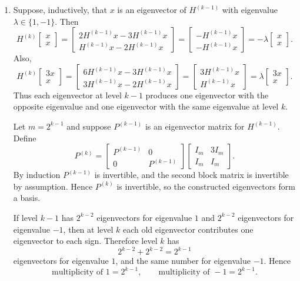 \documentclass[12pt]{article}
\begin{document}
\begin{enumerate}[label=(\alph*)]
  \item Suppose, inductively, that $x$ is an eigenvector of $H^{(k-1)}$ with eigenvalue $\lambda\in\{1,-1\}$. Then
  \[
  H^{(k)}\begin{bmatrix}x\\x\end{bmatrix}
  =\begin{bmatrix}2H^{(k-1)}x-3H^{(k-1)}x\\H^{(k-1)}x-2H^{(k-1)}x\end{bmatrix}
  =\begin{bmatrix}-H^{(k-1)}x\\-H^{(k-1)}x\end{bmatrix}
  =-\lambda\begin{bmatrix}x\\x\end{bmatrix}.
  \]
  Also,
  \[
  H^{(k)}\begin{bmatrix}3x\\x\end{bmatrix}
  =\begin{bmatrix}6H^{(k-1)}x-3H^{(k-1)}x\\3H^{(k-1)}x-2H^{(k-1)}x\end{bmatrix}
  =\begin{bmatrix}3H^{(k-1)}x\\H^{(k-1)}x\end{bmatrix}
  =\lambda\begin{bmatrix}3x\\x\end{bmatrix}.
  \]
  Thus each eigenvector at level $k-1$ produces one eigenvector with the opposite eigenvalue and one eigenvector with the same eigenvalue at level $k$.

  Let $m=2^{k-1}$ and suppose $P^{(k-1)}$ is an eigenvector matrix for $H^{(k-1)}$. Define
  \[
  P^{(k)}=\begin{bmatrix}P^{(k-1)}&0\\0&P^{(k-1)}\end{bmatrix}
  \begin{bmatrix}I_m&3I_m\\I_m&I_m\end{bmatrix}.
  \]
  By induction $P^{(k-1)}$ is invertible, and the second block matrix is invertible by assumption. Hence $P^{(k)}$ is invertible, so the constructed eigenvectors form a basis.

  If level $k-1$ has $2^{k-2}$ eigenvectors for eigenvalue $1$ and $2^{k-2}$ eigenvectors for eigenvalue $-1$, then at level $k$ each old eigenvector contributes one eigenvector to each sign. Therefore level $k$ has
  \[
  2^{k-2}+2^{k-2}=2^{k-1}
  \]
  eigenvectors for eigenvalue $1$, and the same number for eigenvalue $-1$. Hence
  \[
  \boxed{\text{multiplicity of }1=2^{k-1},
  \qquad
  \text{multiplicity of }-1=2^{k-1}.}
  \]
\end{enumerate}
\end{document}
